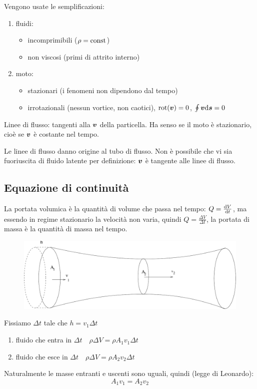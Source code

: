 \begin{minipage}[]{\textwidth}
Vengono usate le semplificazioni:
\begin{enumerate}
\item fluidi:
\begin{itemize}
\item incomprimibili ($\rho=\text{const}$)
\item non viscosi (primi di attrito interno)
\end{itemize}
\item moto:
\begin{itemize}
\item stazionari (i fenomeni non dipendono dal tempo)
\item irrotazionali (nessun vortice, non caotici), $\mathrm{rot}(\boldsymbol{v})=0$, $\oint \boldsymbol{v} \mathrm{d} \boldsymbol{s}=0$
\end{itemize}
\end{enumerate}
\end{minipage}
Linee di flusso: tangenti alla $\boldsymbol{v}$ della particella. Ha senso se il moto è stazionario, cioè se $\boldsymbol{v}$ è costante nel tempo.

Le linee di flusso danno origine al tubo di flusso. Non è possibile che vi sia fuoriuscita di fluido latente per definizione: $\boldsymbol{v}$ è tangente alle linee di flusso.

\subsection{Equazione di continuità}
La portata volumica è la quantità di volume che passa nel tempo: $Q=\frac{\mathrm{d} V}{\mathrm{d} t}$, ma essendo in regime stazionario la velocità non varia, quindi $Q=\frac{\Delta V}{\Delta t}$, la portata di massa è la quantità di massa nel tempo.


\begin{figure}[htbp]
\centering
\includegraphics[scale=0.4]{immagini/fisica1/equazione_continuita}
\end{figure}
Fissiamo $\Delta t$ tale che $h=v_1\Delta t$
\begin{enumerate}
\item fluido che entra in $\Delta t\quad \rho\Delta V=\rho A_1v_1\Delta t$
\item fluido che esce in $\Delta t\quad \rho\Delta V=\rho A_2v_2\Delta t$
\end{enumerate}
Naturalmente le masse entranti e uscenti sono uguali, quindi (legge di Leonardo):
\begin{equation*}A_1v_1=A_2v_2\end{equation*}

